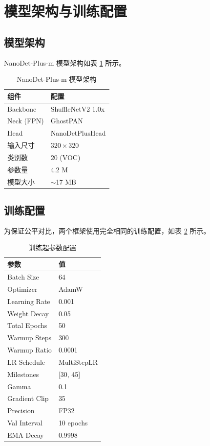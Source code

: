 \documentclass[12pt,a4paper]{article}
\begin{document}
\section{模型架构与训练配置}

\subsection{模型架构}

NanoDet-Plus-m 模型架构如表 \ref{tab:model_arch} 所示。

\begin{table}[H]
\centering
\caption{NanoDet-Plus-m 模型架构}
\label{tab:model_arch}
\begin{tabular}{ll}
\toprule
\textbf{组件} & \textbf{配置} \\
\midrule
Backbone & ShuffleNetV2 1.0x \\
Neck (FPN) & GhostPAN \\
Head & NanoDetPlusHead \\
输入尺寸 & $320 \times 320$ \\
类别数 & 20 (VOC) \\
参数量 & 4.2 M \\
模型大小 & $\sim$17 MB \\
\bottomrule
\end{tabular}
\end{table}

\subsection{训练配置}

为保证公平对比，两个框架使用完全相同的训练配置，如表 \ref{tab:train_config} 所示。

\begin{table}[H]
\centering
\caption{训练超参数配置}
\label{tab:train_config}
\begin{tabular}{ll}
\toprule
\textbf{参数} & \textbf{值} \\
\midrule
Batch Size & 64 \\
Optimizer & AdamW \\
Learning Rate & 0.001 \\
Weight Decay & 0.05 \\
Total Epochs & 50 \\
Warmup Steps & 300 \\
Warmup Ratio & 0.0001 \\
LR Schedule & MultiStepLR \\
Milestones & [30, 45] \\
Gamma & 0.1 \\
Gradient Clip & 35 \\
Precision & FP32 \\
Val Interval & 10 epochs \\
EMA Decay & 0.9998 \\
\bottomrule
\end{tabular}
\end{table}
\end{document}
